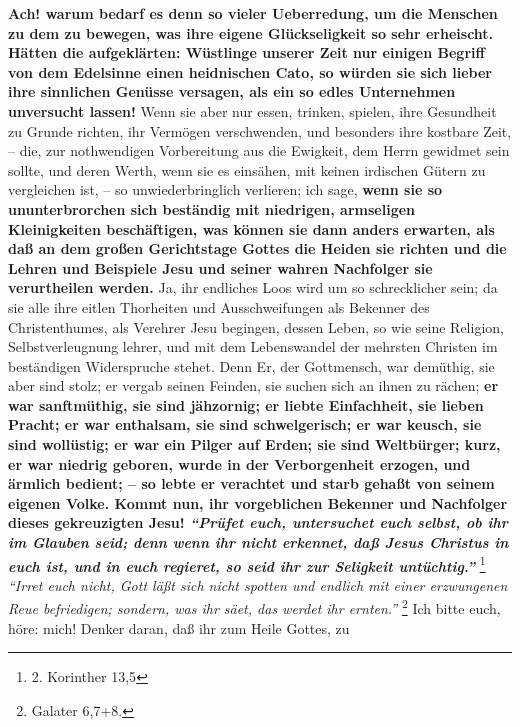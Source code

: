 \medskip

\label{ref:18_11_ueberredung}
\textbf{Ach! warum bedarf es denn so vieler Ueberredung, um die Menschen zu dem
zu
bewegen, was ihre eigene Glückseligkeit so sehr erheischt. Hätten die
aufgeklärten: Wüstlinge unserer Zeit nur einigen Begriff von dem Edelsinne einen
heidnischen Cato, so würden sie sich lieber ihre
sinnlichen Genüsse
versagen, als ein so edles Unternehmen unversucht lassen!} Wenn sie aber nur
essen, trinken, spielen, ihre Gesundheit zu Grunde richten, ihr Vermögen
verschwenden, und besonders ihre kostbare Zeit, -- die, zur nothwendigen
Vorbereitung aus die Ewigkeit, dem Herrn gewidmet sein sollte, und deren Werth,
wenn sie es einsähen, mit keinen irdischen Gütern zu vergleichen ist, -- so
unwiederbringlich verlieren; ich sage, \textbf{wenn sie so ununterbrorchen sich
beständig mit niedrigen, armseligen Kleinigkeiten beschäftigen, was können sie
dann anders erwarten, als daß an dem großen Gerichtstage Gottes die
Heiden sie
richten und die Lehren und Beispiele Jesu und seiner wahren Nachfolger sie
verurtheilen werden.} Ja, ihr endliches Loos wird um so schrecklicher sein; da
sie alle ihre eitlen Thorheiten und Ausschweifungen als Bekenner des
Christenthumes, als Verehrer Jesu begingen, dessen Leben, so wie seine
Religion, Selbstverleugnung lehrer, und mit dem Lebenswandel der mehrsten
Christen im beständigen Widerspruche stehet. Denn Er, der
Gottmensch, war
demüthig, sie aber sind stolz; er vergab seinen Feinden, sie suchen sich an
ihnen zu rächen; \textbf{er war sanftmüthig, sie sind jähzornig; er liebte
Einfachheit,
sie lieben Pracht; er war enthalsam, sie sind schwelgerisch; er war keusch, sie
sind wollüstig; er war ein Pilger auf Erden; sie sind Weltbürger; kurz, er war
niedrig geboren, wurde in der Verborgenheit erzogen, und ärmlich  bedient; -- so
lebte er verachtet und starb gehaßt von seinem eigenen Volke. Kommt nun, ihr
vorgeblichen Bekenner und Nachfolger dieses gekreuzigten Jesu!
\textit{"`Prüfet euch,
untersuchet euch selbst, ob ihr im Glauben seid; denn wenn ihr nicht erkennet,
daß Jesus Christus in euch ist, und in euch regieret, so seid ihr zur
Seligkeit untüchtig."'}}
\footnote{2. Korinther 13,5}
\textit{"`Irret euch
nicht, Gott läßt sich nicht spotten und endlich mit einer erzwungenen Reue
befriedigen; sondern, was ihr säet, das werdet ihr ernten."'}
\footnote{Galater 6,7+8.}
Ich bitte euch, höre: mich! Denker daran, daß ihr zum Heile Gottes, zu
